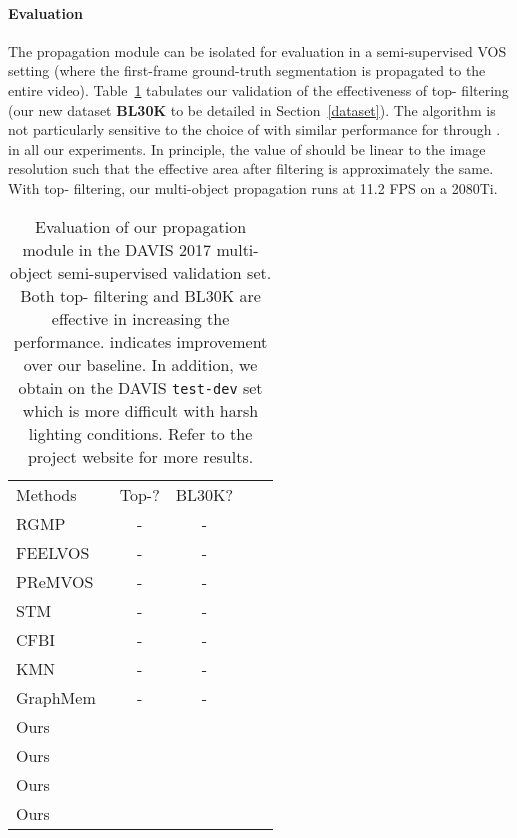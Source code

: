 \documentclass[final]{cvpr}
\newcommand{\cmark}{\ding{51}}\newcommand{\xmark}{\ding{55}}
\begin{document}
	\vspace{-4mm}
	\paragraph{Evaluation}
	The propagation module can be isolated for evaluation in a semi-supervised VOS setting (where the first-frame ground-truth segmentation is propagated to the entire video). 
	Table~\ref{tab:prop_ablation} tabulates our validation of the effectiveness of top- filtering (our new dataset \textbf{BL30K} to be detailed in Section~\ref{dataset}).
	The algorithm is not particularly sensitive to the choice of  with similar performance for  through .  in all our experiments. In principle, the value of  should be linear to the image resolution such that the effective area after filtering is approximately the same. With top- filtering, our multi-object propagation runs at 11.2 FPS on a 2080Ti.


	\begin{table}[h]
		\vspace{-0.10in}
		\centering
		\begin{tabular}{l|c|c|c@{}l}
			\hline
			Methods & Top-? & BL30K? & \multicolumn{2}{c}{} \\
			\Xhline{3\arrayrulewidth}
			RGMP~\cite{oh2018fastRGMP} & - & - & \quad &\\
			FEELVOS~\cite{voigtlaender2019feelvos} & - & - & \quad &\\
			PReMVOS~\cite{luiten2018premvos} & - & - & \quad &\\
			STM~\cite{oh2019videoSTM} & - & - & \quad &\\
			CFBI~\cite{yang2020collaborativeCFBI} & - & - & \quad &\\
			KMN~\cite{seong2020kernelizedMemory} & - & - & \quad &\\
			GraphMem~\cite{lu2020videoGraphMem} & - & - & \quad &\\
			\hline
			Ours & \xmark & \xmark & \quad &  \\ 
			Ours & \xmark & \cmark & \quad &  \\ 
			Ours & \cmark & \xmark & \quad &  \\ 
			Ours & \cmark & \cmark & \quad &  \\ 
			\hline
		\end{tabular}
		\caption{Evaluation of our propagation module in the DAVIS 2017 multi-object semi-supervised validation set. Both top- filtering and BL30K are effective in increasing the performance. 
		 indicates improvement over our baseline. 
		In addition, we obtain  on the DAVIS {\tt\small test-dev} set which is more difficult with harsh lighting conditions. Refer to the project website for more results.
		}
		\label{tab:prop_ablation}
		\vspace{-0.15in}
	\end{table}
	
\end{document}
